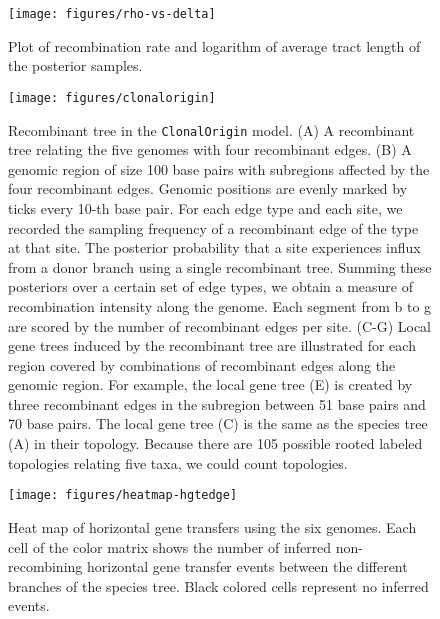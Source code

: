 \documentclass[10pt]{article}
\begin{document}
\begin{figure}
\begin{center}
\texttt{[image: figures/rho-vs-delta]}
\end{center}
\caption{Plot of recombination rate and logarithm of average tract length
of the posterior samples.}
\label{fig:rhologdelta}
\end{figure}
\clearpage{}%

\begin{figure}
\texttt{[image: figures/clonalorigin]}
\caption{\label{fig:clonalorigin}Recombinant tree in the \texttt{ClonalOrigin} model.
(A) A recombinant tree relating the five genomes with four recombinant edges.
(B) A genomic region of size 100 base pairs with subregions affected by the
four recombinant edges. Genomic positions are evenly marked by ticks every 10-th
base pair.  For each edge type and each site, we recorded the sampling frequency
of a recombinant edge of the type at that site.  The posterior probability that
a site experiences influx from a donor branch using a single recombinant tree.
Summing these posteriors over a certain set of edge types, we obtain a measure
of recombination intensity along the genome.  Each segment from b to g are
scored by the number of recombinant edges per site.  (C-G) Local gene trees
induced by the recombinant tree are illustrated for each region covered by
combinations of recombinant edges along the genomic region. For example, the
local gene tree (E) is created by three recombinant edges in the subregion
between 51 base pairs and 70 base pairs. The local gene tree (C) is the same as
the species tree (A) in their topology.  Because there are 105 possible rooted
labeled topologies relating five taxa, we could count topologies.}
\end{figure}
\clearpage{}%

\begin{figure}
\begin{center}
\texttt{[image: figures/heatmap-hgtedge]}
\end{center}
\caption{\label{fig:hgt-heatmap}Heat map of horizontal gene transfers using the
six genomes.
Each cell of the color matrix shows the number of inferred non-recombining
horizontal gene transfer events between the different branches of the species
tree. Black colored cells represent no inferred events.}
\end{figure}
\clearpage{}%
\end{document}
